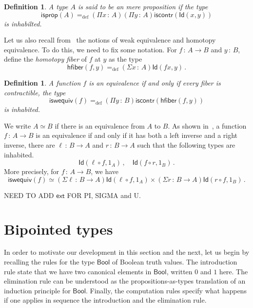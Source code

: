 \documentclass[10pt,a4paper,oneside,reqno]{amsart}
\theoremstyle{mythm}
\theoremstyle{mydef}
\newtheorem{definition}[theorem]{Definition}
\theoremstyle{myrmk}
\newcommand{\ie}{\text{i.e.\ }}
\newcommand{\defeq}{=_{\mathrm{def}}}
\newcommand{\co}{\,{:}\,}
\newcommand{\hfiber}{\mathsf{hfiber}}
\newcommand{\iscontr}{\mathsf{iscontr}}
\newcommand{\isprop}{\mathsf{isprop}}
\newcommand{\iswequiv}{\mathsf{iswequiv}}
\newcommand{\Bool}{\mathsf{Bool}}
\newcommand{\Id}{\mathsf{Id}}
\begin{document}
\begin{definition} A type $A$ is said to be an \emph{mere proposition} if the type
\[
\isprop(A) \defeq (\Pi x \co A)(\Pi  y \co A) \iscontr( \Id(x,y)) 
\]
is inhabilted.
\end{definition}

Let us also recall from~\cite{VoevodskyV:unifc} the notions of weak equivalence and homotopy equivalence. To do this, we need to fix some notation. For $f \co A \rightarrow B$ and $y \co B$, define the \emph{homotopy fiber} of $f$ at $y$ as the type
\[
 \hfiber(f,y) \defeq (\Sigma x \co A) \Id(f x, y) \, .
\]


\begin{definition} A function $f$ is  an \emph{equivalence} if and only if every fiber is contractible, \ie the type
\[
 \iswequiv(f) \defeq (\Pi y \co B)  \iscontr(\hfiber(f,y)) 
\]
is inhabited. 
\end{definition}

 We write $A\simeq B$ if there is an equivalence from $A$ to $B$.   As shown in~\cite{HoTT}, a function $f \co A \rightarrow B$ is an equivalence if and only if  it has both a left inverse and a right inverse, \ie there are 
$\ell \co B \to A$ and $r \co B \to A$ such that the following types are inhabited. 
\[
 \Id(\ell \circ f, 1_A)\, ,  \quad  \Id(f \circ r, 1_B) \, .
 \] 
More precisely, for $f \co A \rightarrow B$, we have
 \[ 
 \textstyle
 \iswequiv(f) \simeq (\Sigma \ell \co B \to A) \Id( \ell \circ f, 1_A) \times (\Sigma r \co B \to A) \Id( r \circ f , 1_B) \, .
 \]

\begin{center}
NEED TO ADD $\mathsf{ext}$ FOR PI, SIGMA and U. 
\end{center}

\newpage

\section{Bipointed types}
\label{sec:bip}

In order to motivate our development in this section and the next, 
let us begin by recalling the rules for the type $\Bool$ of Boolean truth values. The introduction rule state that we have two canonical elements in $\Bool$, written $0$ and $1$ here. The elimination rule can be understood as the propositions-as-types translation of an induction principle for $\Bool$. Finally, the computation rules specify what happens if one applies in sequence the introduction and the elimination rule.
\end{document}
